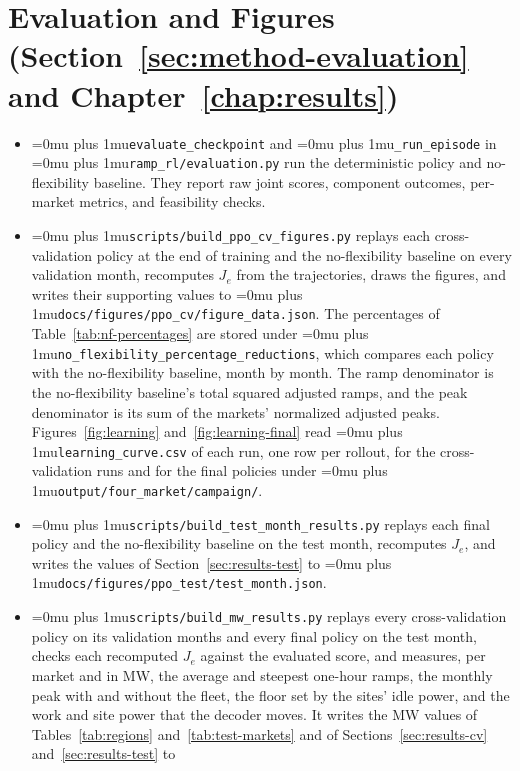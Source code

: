 \documentclass{UNCC-thesis}
\newcommand{\codepath}[1]{{\Urlmuskip=0mu plus 1mu\relax\nolinkurl{#1}}}
\begin{document}
\section{Evaluation and Figures
  (Section~\ref{sec:method-evaluation} and Chapter~\ref{chap:results})}
\begin{itemize}
  \item \codepath{evaluate_checkpoint} and \codepath{_run_episode} in
        \codepath{ramp_rl/evaluation.py} run the deterministic policy and
        no-flexibility baseline. They report raw joint scores, component
        outcomes, per-market metrics, and feasibility checks.
  \item \codepath{scripts/build_ppo_cv_figures.py} replays each cross-validation
        policy at the end of training and the no-flexibility baseline on every validation month, recomputes \(J_e\) from the
        trajectories, draws the figures, and writes their supporting values to
        \codepath{docs/figures/ppo_cv/figure_data.json}. The percentages of
        Table~\ref{tab:nf-percentages} are stored under
        \codepath{no_flexibility_percentage_reductions}, which compares each policy with the
        no-flexibility baseline, month by month. The
        ramp denominator is the no-flexibility baseline's total squared adjusted ramps, and the
        peak denominator is its sum of the markets' normalized adjusted peaks.
        Figures~\ref{fig:learning} and~\ref{fig:learning-final} read \codepath{learning_curve.csv}
        of each run, one row per rollout, for the cross-validation runs and for the final
        policies under \codepath{output/four_market/campaign/}.
  \item \codepath{scripts/build_test_month_results.py} replays each final
        policy and the no-flexibility baseline on the test month, recomputes \(J_e\), and
        writes the values of Section~\ref{sec:results-test} to
        \codepath{docs/figures/ppo_test/test_month.json}.
  \item \codepath{scripts/build_mw_results.py} replays every cross-validation policy on its
        validation months and every final policy on the test month, checks each recomputed
        \(J_e\) against the evaluated score, and measures, per market and in MW, the average and
        steepest one-hour ramps, the monthly peak with and without the fleet, the floor set by
        the sites' idle power, and the work and site power that the decoder moves. It writes the
        MW values of Tables~\ref{tab:regions} and~\ref{tab:test-markets} and of
        Sections~\ref{sec:results-cv} and~\ref{sec:results-test} to

\end{itemize}
\end{document}
